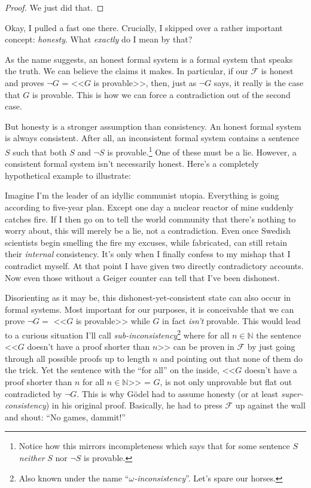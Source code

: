 \documentclass{article}
\newcommand{\F}{\ensuremath{\mathcal{F}}}
\begin{document}
\begin{proof}
We just did that.
\end{proof}

Okay, I pulled a fast one there. Crucially, I skipped over a rather important concept: \textit{honesty}. What \textit{exactly} do I mean by that?

As the name suggests, an honest formal system is a formal system that speaks the truth. We can believe the claims it makes. In particular, if our $\F$ is honest and proves $\neg G$ = <<$G$ is provable>>, then, just as $\neg G$ says, it really is the case that $G$ is provable. This is how we can force a contradiction out of the second case.

But honesty is a stronger assumption than consistency. An honest formal system is always consistent. After all, an inconsistent formal system contains a sentence $S$ such that both $S$ and $\neg S$ is provable.\footnote{Notice how this mirrors incompleteness which says that for some sentence $S$ \textit{neither} $S$ nor $\neg S$ is provable.} One of these must be a lie. However, a consistent formal system isn't necessarily honest. Here's a completely hypothetical example to illustrate: 

Imagine I'm the leader of an idyllic communist utopia. Everything is going according to five-year plan. Except one day a nuclear reactor of mine suddenly catches fire. If I then go on to tell the world community that there's nothing to worry about, this will merely be a lie, not a contradiction. Even once Swedish scientists begin smelling the fire my excuses, while fabricated, can still retain their \textit{internal} consistency. It's only when I finally confess to my mishap that I contradict myself. At that point I have given two directly contradictory accounts. Now even those without a Geiger counter can tell that I've been dishonest.

Disorienting as it may be, this dishonest-yet-consistent state can also occur in formal systems. Most important for our purposes, it is conceivable that we can prove $\neg G =$ <<$G$ is provable>> while $G$ in fact \textit{isn't} provable. This would lead to a curious situation I'll call \textit{sub-inconsistency}\footnote{Also known under the name ``\textit{$\omega$-inconsistency}''. Let's spare our horses.} where for all $n\in\mathbb{N}$ the sentence <<$G$ doesn't have a proof shorter than $n$>> can be proven in $\F$ by just going through all possible proofs up to length $n$ and pointing out that none of them do the trick. Yet the sentence with the ``for all'' on the inside, <<$G$ doesn't have a proof shorter than $n$ for all $n\in\mathbb{N}$>> = $G$, is not only unprovable but flat out contradicted by $\neg G$. This is why Gödel had to assume honesty (or at least \textit{super-consistency}) in his original proof. Basically, he had to press $\F$ up against the wall and shout: ``No games, dammit!''
\end{document}
